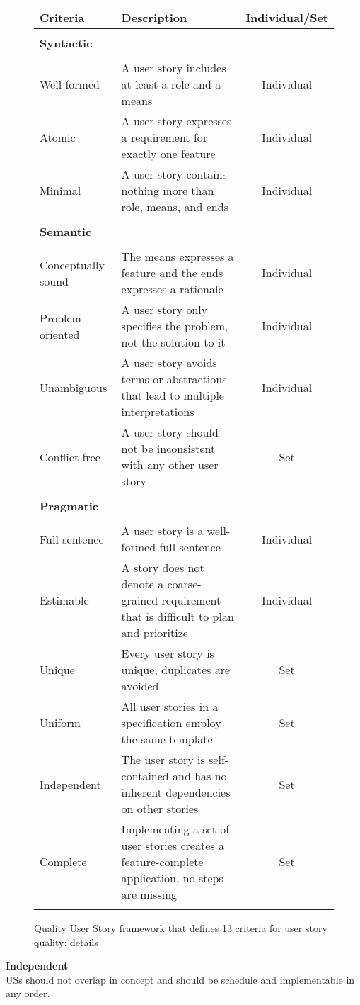 \begin{figure}
\begingroup
\footnotesize

\begin{tabularx}{\textwidth}{l  X  c}
 \hline
 Criteria & Description & Individual/Set \\
\hline
\hline
\\
\textbf{Syntactic} \\
\\ 
Well-formed & A user story includes at least a role and a means & Individual \\
Atomic & A user story expresses a requirement for exactly one feature & Individual \\
Minimal & A user story contains nothing more than role, means, and ends & Individual \\
\\ 
 \textbf{Semantic} \\
 \\ 
Conceptually sound&The means expresses a feature and the ends expresses a rationale & Individual\\
Problem-oriented& A user story only specifies the problem, not the solution to it& Individual\\
Unambiguous&A user story avoids terms or abstractions that lead to multiple interpretations &Individual \\
Conflict-free&A user story should not be inconsistent with any other user story &Set \\
\\ 
\textbf{Pragmatic}\\
\\ 
Full sentence&A user story is a well-formed full sentence &Individual \\
Estimable&A story does not denote a coarse-grained requirement that is difficult to plan and prioritize &Individual \\
Unique&Every user story is unique, duplicates are avoided &Set \\
Uniform&All user stories in a specification employ the same template &Set \\
Independent&The user story is self-contained and has no inherent dependencies on other stories &Set \\
Complete&Implementing a set of user stories creates a feature-complete application, no steps are missing &Set \\
 \\
 \hline

\end{tabularx}
\begin{TableCaption}
\caption{Quality User Story framework that defines 13 criteria for user story quality: details \cite{lucassen2016improving}}\label{tb:qus}
\end{TableCaption}
\endgroup
\end{figure}
\textbf{Independent}\\ 
USs should not overlap in concept and should be schedule and implementable in any order. 

